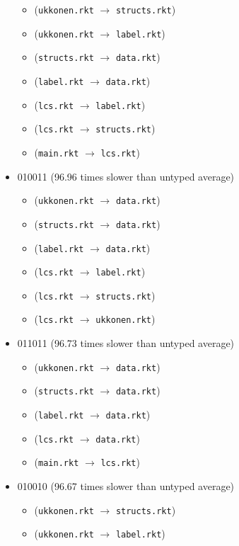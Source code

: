 \documentclass{article}
\newcommand{\mono}[1]{\texttt{#1}}
\begin{document}
\begin{itemize}
  \begin{itemize}
  \item (\mono{ukkonen.rkt} $\rightarrow$ \mono{structs.rkt})
  \item (\mono{ukkonen.rkt} $\rightarrow$ \mono{label.rkt})
  \item (\mono{structs.rkt} $\rightarrow$ \mono{data.rkt})
  \item (\mono{label.rkt} $\rightarrow$ \mono{data.rkt})
  \item (\mono{lcs.rkt} $\rightarrow$ \mono{label.rkt})
  \item (\mono{lcs.rkt} $\rightarrow$ \mono{structs.rkt})
  \item (\mono{main.rkt} $\rightarrow$ \mono{lcs.rkt})
  \end{itemize}
\item 010011 (96.96 times slower than untyped average)
  \begin{itemize}
  \item (\mono{ukkonen.rkt} $\rightarrow$ \mono{data.rkt})
  \item (\mono{structs.rkt} $\rightarrow$ \mono{data.rkt})
  \item (\mono{label.rkt} $\rightarrow$ \mono{data.rkt})
  \item (\mono{lcs.rkt} $\rightarrow$ \mono{label.rkt})
  \item (\mono{lcs.rkt} $\rightarrow$ \mono{structs.rkt})
  \item (\mono{lcs.rkt} $\rightarrow$ \mono{ukkonen.rkt})
  \end{itemize}
\item 011011 (96.73 times slower than untyped average)
  \begin{itemize}
  \item (\mono{ukkonen.rkt} $\rightarrow$ \mono{data.rkt})
  \item (\mono{structs.rkt} $\rightarrow$ \mono{data.rkt})
  \item (\mono{label.rkt} $\rightarrow$ \mono{data.rkt})
  \item (\mono{lcs.rkt} $\rightarrow$ \mono{data.rkt})
  \item (\mono{main.rkt} $\rightarrow$ \mono{lcs.rkt})
  \end{itemize}
\item 010010 (96.67 times slower than untyped average)
  \begin{itemize}
  \item (\mono{ukkonen.rkt} $\rightarrow$ \mono{structs.rkt})
  \item (\mono{ukkonen.rkt} $\rightarrow$ \mono{label.rkt})

\end{itemize}
\end{itemize}
\end{document}
